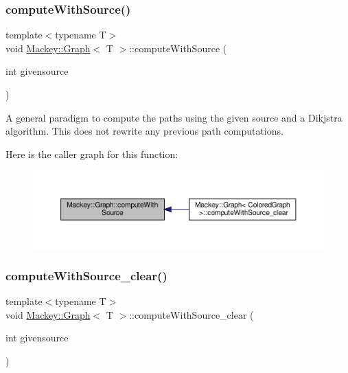\subsubsection{\texorpdfstring{compute\+With\+Source()}{computeWithSource()}}
{\footnotesize\ttfamily template$<$typename T$>$ \\
void \hyperlink{classMackey_1_1Graph}{Mackey\+::\+Graph}$<$ T $>$\+::compute\+With\+Source (\begin{DoxyParamCaption}\item[{int}]{givensource }\end{DoxyParamCaption})\hspace{0.3cm}{\ttfamily [inline]}}



A general paradigm to compute the paths using the given source and a Dikjstra algorithm. This does not rewrite any previous path computations. 

Here is the caller graph for this function\+:\nopagebreak
\begin{figure}[H]
\begin{center}
\leavevmode
\includegraphics[width=350pt]{classMackey_1_1Graph_acda32cd8d144dcd1ec771bd8d2753321_icgraph}
\end{center}
\end{figure}
\mbox{\label{classMackey_1_1Graph_a769966fd9422efb15a53db185a8be278}} 
\subsubsection{\texorpdfstring{compute\+With\+Source\+\_\+clear()}{computeWithSource\_clear()}}
{\footnotesize\ttfamily template$<$typename T$>$ \\
void \hyperlink{classMackey_1_1Graph}{Mackey\+::\+Graph}$<$ T $>$\+::compute\+With\+Source\+\_\+clear (\begin{DoxyParamCaption}\item[{int}]{givensource }\end{DoxyParamCaption})\hspace{0.3cm}{\ttfamily [inline]}}



